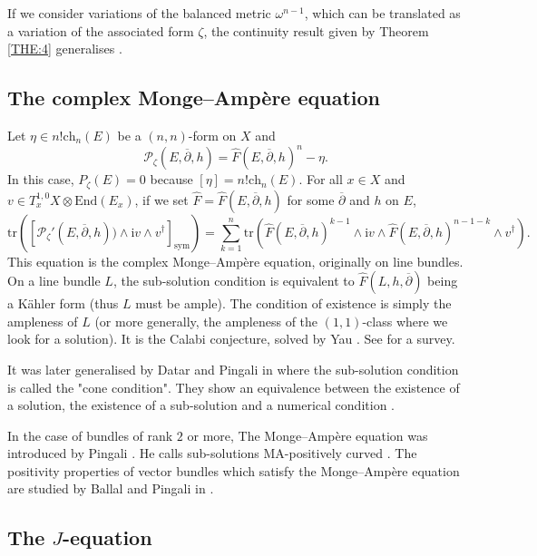 \documentclass{article}
\theoremstyle{remark}
\theoremstyle{definition}
\newcommand{\End}{\mathrm{End}}
\newcommand{\tr}{\mathrm{tr}}
\renewcommand{\i}{\boldsymbol{\mathrm{i}}}
\newcommand{\mP}{\mathcal{P}}
\newcommand{\dbar}{\overline{\partial}}
\newcommand{\ch}{\mathrm{ch}}
\newcommand{\sym}{\mathrm{sym}}
\begin{document}
If we consider variations of the balanced metric $\omega^{n - 1}$, which can be translated as a variation of the associated form $\zeta$, the continuity result given by Theorem \ref{THE:4} generalises \cite{Delloque_2024}.

\subsection{The complex Monge--Ampère equation}

Let $\eta \in n!\ch_n(E)$ be a $(n,n)$-form on $X$ and
$$
\mP_\zeta(E,\dbar,h) = \hat{F}(E,\dbar,h)^n - \eta.
$$
In this case, $P_\zeta(E) = 0$ because $[\eta] = n!\ch_n(E)$. For all $x \in X$ and $v \in T_x^{1,0}X \otimes \End(E_x)$, if we set $\hat{F} = \hat{F}(E,\dbar,h)$ for some $\dbar$ and $h$ on $E$,
$$
\tr([\mP_\zeta'(E,\dbar,h)) \wedge \i v \wedge v^\dagger]_\sym) = \sum_{k = 1}^n \tr\left(\hat{F}(E,\dbar,h)^{k - 1} \wedge \i v \wedge \hat{F}(E,\dbar,h)^{n - 1 - k} \wedge v^\dagger \right).
$$
This equation is the complex Monge--Ampère equation, originally on line bundles. On a line bundle $L$, the sub-solution condition is equivalent to $\hat{F}(L,h,\dbar)$ being a Kähler form (thus $L$ must be ample). The condition of existence is simply the ampleness of $L$ (or more generally, the ampleness of the $(1,1)$-class where we look for a solution). It is the Calabi conjecture, solved by Yau \cite{Yau}. See \cite{Collins_Shi} for a survey.

It was later generalised by Datar and Pingali in \cite{Datar_Pingali} where the sub-solution condition is called the "cone condition". They show an equivalence between the existence of a solution, the existence of a sub-solution and a numerical condition \cite[Theorem 1.1]{Datar_Pingali}.

In the case of bundles of rank $2$ or more, The Monge--Ampère equation was introduced by Pingali \cite{Pingali}. He calls sub-solutions MA-positively curved \cite[page 2]{Pingali}. The positivity properties of vector bundles which satisfy the Monge--Ampère equation are studied by Ballal and Pingali in \cite{Ballal_Pingali}.

\subsection{The $J$-equation}
\end{document}
